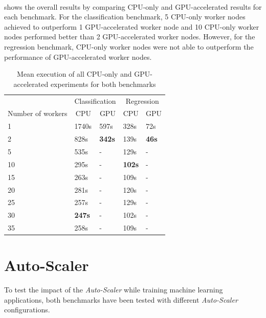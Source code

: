 \paragraph{}
 shows the overall results by comparing CPU-only and GPU-accelerated results for each benchmark.
For the classification benchmark, 5 CPU-only worker nodes achieved to outperform 1 GPU-accelerated worker node and 10 CPU-only worker nodes performed better than 2 GPU-accelerated worker nodes.
However, for the regression benchmark, CPU-only worker nodes were not able to outperform the performance of GPU-accelerated worker nodes.
\begin{table}[ht]
\centering
\begin{tabular}{@{}l|ll|ll@{}}
\toprule
                  & \multicolumn{2}{c|}{Classification}                & \multicolumn{2}{c}{Regression}                    \\
Number of workers & \multicolumn{1}{c}{CPU} & \multicolumn{1}{c|}{GPU} & \multicolumn{1}{c}{CPU} & \multicolumn{1}{c}{GPU} \\ \midrule
1  & 1740s         & 597s          & 328s          & 72s \\
2  & 828s          & \textbf{342s} & 139s          & \textbf{46s} \\
5  & 535s          & -             & 129s          & -     \\
10 & 295s          & -             & \textbf{102s} & -     \\
15 & 263s          & -             & 109s          & -     \\
20 & 281s          & -             & 120s          & -     \\
25 & 257s          & -             & 129s          & -     \\
30 & \textbf{247s} & -             & 102s          & -     \\
35 & 258s          & -             & 109s          & -     \\ \bottomrule
\end{tabular}
\caption{Mean execution of all CPU-only and GPU-accelerated experiments for both benchmarks}
\label{table:07_gpu_overall_results}
\end{table}


\section{Auto-Scaler}
To test the impact of the \textit{Auto-Scaler} while training machine learning applications, both benchmarks have been tested with different \textit{Auto-Scaler} configurations. 


